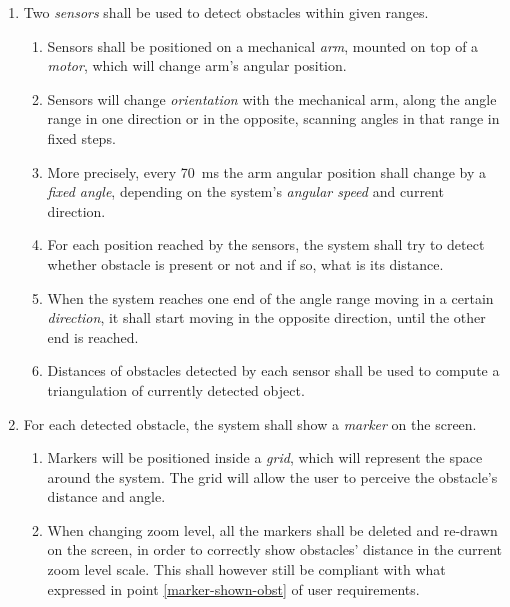 \begin{enumerate}
    \item Two {\em sensors} shall be used to detect obstacles within given ranges.
    
    \begin{enumerate}
        \item Sensors shall be positioned on a mechanical {\em arm}, mounted on top of a {\em motor}, which will change arm's angular position.
        
        \item Sensors will change {\em orientation} with the mechanical arm, along the angle range in one direction or in the opposite, scanning angles in that range in fixed steps.
        
        \item More precisely, every \SI{70}{\milli\second} the arm angular position shall change by a {\em fixed angle}, depending on the system's {\em angular speed} and current direction.
        
        \item For each position reached by the sensors, the system shall try to detect whether obstacle is present or not and if so, what is its distance.
        
        \item When the system reaches one end of the angle range moving in a certain {\em direction}, it shall start moving in the opposite direction, until the other end is reached.
        
        \item Distances of obstacles detected by each sensor shall be used to compute a triangulation of currently detected object.
        
        
    \end{enumerate}
    
    \item For each detected obstacle, the system shall show a {\em marker} on the screen.
    
    \begin{enumerate}
    
        \item Markers will be positioned inside a {\em grid}, which will represent the space around the system. The grid will allow the user to perceive the obstacle's distance and angle.
        
        \item When changing zoom level, all the markers shall be deleted and re-drawn on the screen, in order to correctly show obstacles' distance in the current zoom level scale. This shall however still be compliant with what expressed in point \ref{marker-shown-obst} of user requirements.
    
    \end{enumerate}
    
\end{enumerate}

